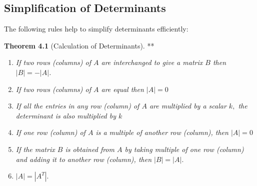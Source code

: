 \documentclass[
  letterpaper,
  DIV=11,
  numbers=noendperiod]{scrartcl}
\theoremstyle{remark}
\begin{document}
\subsection{Simplification of
Determinants}\label{simplification-of-determinants}

The following rules help to simplify determinants efficiently:

\label{calcdet}
\textbf{Theorem 4.1} (Calculation of Determinants). **

\begin{enumerate}
\def\labelenumi{\arabic{enumi}.}
\item
  \emph{If two rows (columns) of \(A\) are interchanged to give a matrix
  \(B\) then \(\left| B\right| =-\left| A\right|\).}
\item
  \emph{If two rows (columns) of \(A\) are equal then
  \(\left| A\right| =0\)}
\item
  \emph{If all the entries in any row (column) of \(A\) are multiplied
  by a scalar \(k,\) the determinant is also multiplied by \(k\)}
\item
  \emph{If one row (column) of \(A\) is a multiple of another row
  (column), then \(\left|
  A\right| =0\)}
\item
  \emph{If the matrix \(B\) is obtained from \(A\) by taking multiple of
  one row (column) and adding it to another row (column), then
  \(\left| B\right|
  =\left| A\right| .\)}
\item
  \emph{\(\left| A\right| =\left| A^{T}\right| .\)}
\end{enumerate}
\end{document}
